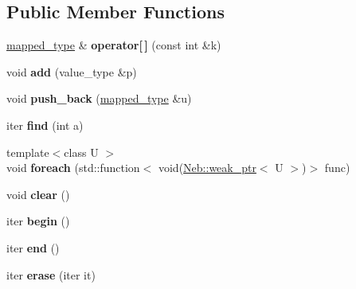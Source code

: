 \subsection*{\-Public \-Member \-Functions}
\begin{DoxyCompactItemize}
\item 
\hypertarget{classNeb_1_1Map_a619275cf1c717233117860461cd8207d}{\hyperlink{classNeb_1_1unique__ptr}{mapped\-\_\-type} \& {\bfseries operator\mbox{[}$\,$\mbox{]}} (const int \&k)}\label{classNeb_1_1Map_a619275cf1c717233117860461cd8207d}

\item 
\hypertarget{classNeb_1_1Map_acd4f6527c258fbce9bbfa13b4c29128c}{void {\bfseries add} (value\-\_\-type \&p)}\label{classNeb_1_1Map_acd4f6527c258fbce9bbfa13b4c29128c}

\item 
\hypertarget{classNeb_1_1Map_a5bff24c0bbb40e952f03201bf0068432}{void {\bfseries push\-\_\-back} (\hyperlink{classNeb_1_1unique__ptr}{mapped\-\_\-type} \&u)}\label{classNeb_1_1Map_a5bff24c0bbb40e952f03201bf0068432}

\item 
\hypertarget{classNeb_1_1Map_a6a0aa4204a34ac09566fcefcdb0b2613}{iter {\bfseries find} (int a)}\label{classNeb_1_1Map_a6a0aa4204a34ac09566fcefcdb0b2613}

\item 
\hypertarget{classNeb_1_1Map_a053be30ff1b6e6f0e5396406ee1da55a}{{\footnotesize template$<$class U $>$ }\\void {\bfseries foreach} (std\-::function$<$ void(\hyperlink{classNeb_1_1weak__ptr}{\-Neb\-::weak\-\_\-ptr}$<$ \-U $>$)$>$ func)}\label{classNeb_1_1Map_a053be30ff1b6e6f0e5396406ee1da55a}

\item 
\hypertarget{classNeb_1_1Map_ae0fedef74480d411f5b35583927e237c}{void {\bfseries clear} ()}\label{classNeb_1_1Map_ae0fedef74480d411f5b35583927e237c}

\item 
\hypertarget{classNeb_1_1Map_ae6e1c2ef08531a5696515392e2ddf811}{iter {\bfseries begin} ()}\label{classNeb_1_1Map_ae6e1c2ef08531a5696515392e2ddf811}

\item 
\hypertarget{classNeb_1_1Map_aad55064cd5483e90f2e0badc1b47a18c}{iter {\bfseries end} ()}\label{classNeb_1_1Map_aad55064cd5483e90f2e0badc1b47a18c}

\item 
\hypertarget{classNeb_1_1Map_a5bbe7fb4b2899bb707cf38e3c2ecd0ea}{iter {\bfseries erase} (iter it)}\label{classNeb_1_1Map_a5bbe7fb4b2899bb707cf38e3c2ecd0ea}

\end{DoxyCompactItemize}

